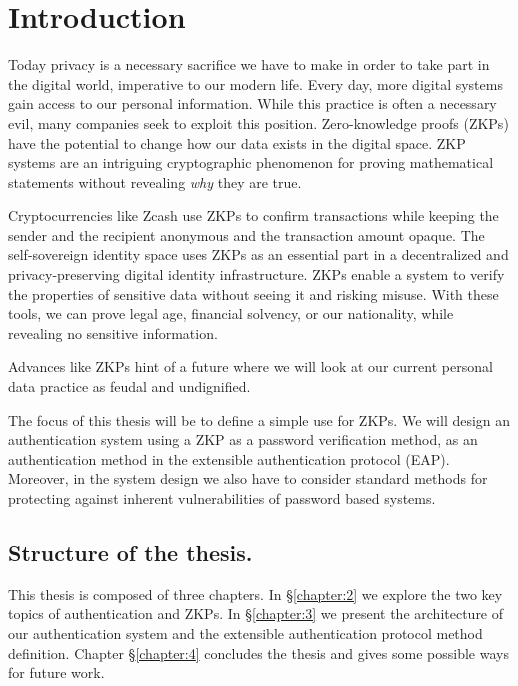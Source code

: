 \chapter{Introduction}
\label{chapter:1}

\noindent
Today privacy is a necessary sacrifice we have to make in order to take part in the digital world, imperative to our modern life.
Every day, more digital systems gain access to our personal information. While this practice is often a necessary evil, many companies seek to exploit this position.
Zero-knowledge proofs (ZKPs) have the potential to change how our data exists in the digital space. 
ZKP systems are an intriguing cryptographic phenomenon for proving mathematical statements without revealing \textit{why} they are true.

Cryptocurrencies like Zcash \cite{hopwood2016zcash} use ZKPs to confirm transactions while keeping the sender and the recipient anonymous and the transaction amount opaque.
The self-sovereign identity space \cite{tobin2016inevitable} uses ZKPs as an essential part in a decentralized and privacy-preserving digital identity infrastructure.
ZKPs enable a system to verify the properties \cite{10.1007/978-3-540-89255-7_15} of sensitive data without seeing it and risking misuse. With these tools, we can prove legal age, financial solvency, or our nationality, while revealing no sensitive information.

Advances like ZKPs hint of a future where we will look at our current personal data practice as feudal and undignified.

\bigskip
\noindent
The focus of this thesis will be to define a simple use for ZKPs.
We will design an authentication system using a ZKP as a password verification method, as an authentication method in the extensible authentication protocol (EAP).
Moreover, in the system design we also have to consider standard methods for protecting against inherent vulnerabilities of password based systems.
\section{Structure of the thesis.}
This thesis is composed of three chapters.
In \S\ref{chapter:2} we explore the two key topics of authentication and ZKPs.
In \S\ref{chapter:3} we present the architecture of our authentication system and the extensible authentication protocol method definition.
Chapter \S\ref{chapter:4} concludes the thesis and gives some possible ways for future work.

\newpage